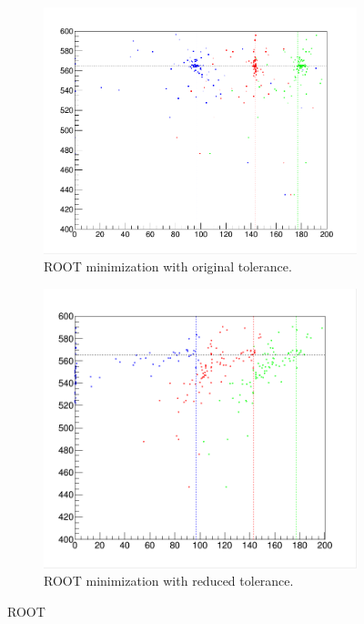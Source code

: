 \documentclass[twoside,english]{uiofysmaster}
\begin{document}
\begin{figure}[hbt]
	\centering
	\begin{subfigure}[b]{0.6\textwidth}
		\includegraphics[width=\textwidth]{figures/making-sense/root-fit_pythia-full_tol-original.png} 
		\caption{ROOT minimization with original tolerance.}
	\end{subfigure}

	\begin{subfigure}[b]{0.6\textwidth}
		\includegraphics[width=\textwidth]{figures/making-sense/root-fit_tol-1e-4_pythia-full_2000iter.png} 
		\caption{ROOT minimization with reduced tolerance.}
	\end{subfigure}
	\label{root}
	\caption{ROOT}
\end{figure}
\end{document}
